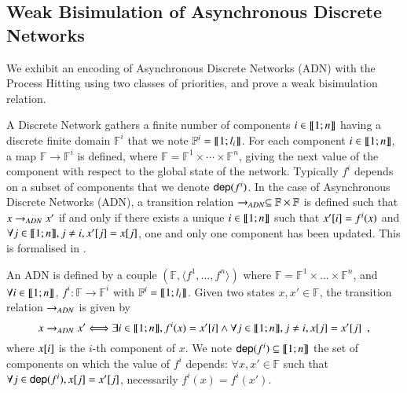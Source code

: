 \subsection{Weak Bisimulation of Asynchronous Discrete Networks}
\label{sec:dn}

We exhibit an encoding of Asynchronous Discrete Networks (ADN) with the Process
Hitting using two classes of priorities, and prove a weak bisimulation relation.

A Discrete Network gathers a finite number of components $i\in\llbracket 1; n \rrbracket$ having a discrete finite domain
$\mathbb F^i$ that we note $\mathbb{F}^i = \llbracket 1; l_i \rrbracket$.
For each component $i\in\llbracket 1; n \rrbracket$, a map $\mathbb F \rightarrow \mathbb F^i$ is defined, where
$\mathbb F = \mathbb F^1 \times \cdots \times \mathbb F^n$, giving the next value of the component
with respect to the global state of the network.
Typically $f^i$ depends on a subset of components that we denote $\mathsf{dep}(f^i)$.
In the case of Asynchronous Discrete Networks (ADN), a transition relation $\rightarrow_{ADN}\subseteq \mathbb
F\times \mathbb F$ is defined such that $x\rightarrow_{ADN} x'$ if and only if there exists a unique
$i\in\llbracket 1; n \rrbracket$ such that $x'[{i}]=f^i(x)$ and $\forall j\in\llbracket 1; n \rrbracket, j\neq i, x'[{j}]
=x[{j}]$, \ie one and only one component has been updated.
This is formalised in .

\begin{definition}
\label{def:DN}
  An ADN is defined by a couple $(\mathbb F, \langle f^1, \dots, f^n \rangle)$
  where $\mathbb{F} = \mathbb{F}^1\times\dots\times\mathbb{F}^n$,
  and $\forall i\in\llbracket 1; n \rrbracket$,
  $f^i: \mathbb{F} \rightarrow \mathbb{F}^i$ with
  $\mathbb{F}^i = \llbracket 1; l_i \rrbracket$.
  Given two states $x,x'\in\mathbb F$, the transition relation $\rightarrow_{ADN}$ is given by
  \[
  x\rightarrow_{ADN} x' \Longleftrightarrow
    \exists i\in\llbracket 1; n \rrbracket, f^i(x)=x'[{i}]
    \wedge \forall j\in\llbracket 1; n \rrbracket, j\neq i, x[{j}]=x'[{j}]
  \enspace,
  \]
  where $x[{i}]$ is the $i$-th component of $x$.
  We note $\mathsf{dep}(f^i)\subseteq \llbracket 1; n \rrbracket$ the set of components on which the value of $f^i$
  depends: $\forall x,x'\in \mathbb F$ such that $\forall
  j\in\mathsf{dep}(f^i), x[{j}]=x'[{j}]$, necessarily $f^i(x)=f^i(x')$.
\end{definition}


